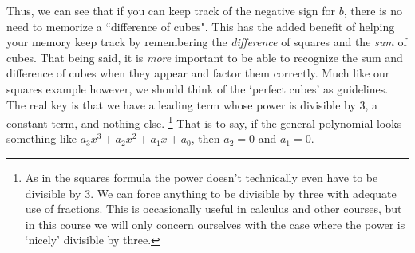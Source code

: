 \documentclass{ximeraXloud}
\begin{document}
    Thus, we can see that if you can keep track of the negative sign for $b$, there is no need to memorize a ``difference of cubes". This has the added benefit of helping your memory keep track by remembering the \textit{difference} of squares and the \textit{sum} of cubes. That being said, it is \textit{more} important to be able to recognize the sum and difference of cubes when they appear and factor them correctly. Much like our squares example however, we should think of the `perfect cubes' as guidelines. The real key is that we have a leading term whose power is divisible by 3, a constant term, and nothing else.%
    \footnote{%
        As in the squares formula the power doesn't technically even have to be divisible by 3. We can force anything to be divisible by three with adequate use of fractions. This is occasionally useful in calculus and other courses, but in this course we will only concern ourselves with the case where the power is `nicely' divisible by three.%
        }
    That is to say, if the general polynomial looks something like $a_3x^3 + a_2x^2 + a_1x + a_0$, then $a_2 = 0$ and $a_1 = 0$.
\end{document}
